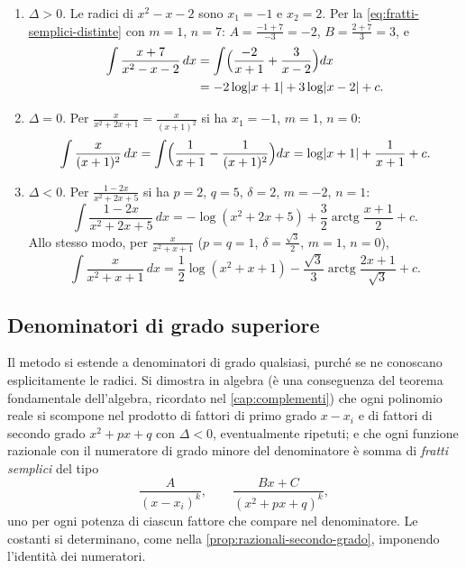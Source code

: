 \begin{esempio}\label{es:tre-casi}
\begin{enumerate}[label=\textup{(\alph*)}]
  \item $\Delta>0$. Le radici di $x^{2}-x-2$ sono $x_{1}=-1$ e $x_{2}=2$. Per la
  \eqref{eq:fratti-semplici-distinte} con $m=1$, $n=7$: $A=\frac{-1+7}{-3}=-2$,
  $B=\frac{2+7}3=3$, e
  \[
  \begin{aligned}
    \int\frac{x+7}{x^{2}-x-2}\,dx&=\int\Bigl(\frac{-2}{x+1}+\frac3{x-2}\Bigr)dx\\
    &=-2\log\lvert x+1\rvert+3\log\lvert x-2\rvert+c .
  \end{aligned}
  \]
  \item $\Delta=0$. Per $\frac x{x^{2}+2x+1}=\frac x{(x+1)^{2}}$ si ha $x_{1}=-1$, $m=1$, $n=0$:
  \[
    \int\frac x{(x+1)^{2}}\,dx=\int\Bigl(\frac1{x+1}-\frac1{(x+1)^{2}}\Bigr)dx
    =\log\lvert x+1\rvert+\frac1{x+1}+c .
  \]
  \item $\Delta<0$. Per $\frac{1-2x}{x^{2}+2x+5}$ si ha $p=2$, $q=5$, $\delta=2$, $m=-2$, $n=1$:
  \[
    \int\frac{1-2x}{x^{2}+2x+5}\,dx=-\log(x^{2}+2x+5)+\frac32\operatorname{arctg}\frac{x+1}2+c .
  \]
  Allo stesso modo, per $\frac x{x^{2}+x+1}$ ($p=q=1$, $\delta=\frac{\sqrt3}2$, $m=1$, $n=0$),
  \[
    \int\frac x{x^{2}+x+1}\,dx=\frac12\log(x^{2}+x+1)-\frac{\sqrt3}3\operatorname{arctg}
    \frac{2x+1}{\sqrt3}+c .
  \]
\end{enumerate}
\end{esempio}

\subsection{Denominatori di grado superiore}

Il metodo si estende a denominatori di grado qualsiasi, purché se ne conoscano
esplicitamente le radici. Si dimostra in algebra (è una conseguenza del teorema
fondamentale dell'algebra, ricordato nel \cref{cap:complementi}) che ogni polinomio
reale si scompone nel prodotto di fattori di primo grado $x-x_{i}$ e di fattori di secondo
grado $x^{2}+px+q$ con $\Delta<0$, eventualmente ripetuti; e che ogni funzione razionale con
il numeratore di grado minore del denominatore è somma di \emph{fratti semplici} del
tipo
\[
  \frac A{(x-x_{i})^{k}}, \qquad \frac{Bx+C}{(x^{2}+px+q)^{k}} ,
\]
uno per ogni potenza di ciascun fattore che compare nel denominatore. Le costanti si
determinano, come nella \cref{prop:razionali-secondo-grado}, imponendo l'identità dei
numeratori.

